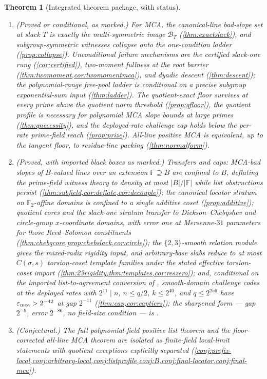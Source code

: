 \documentclass[11pt]{article}
\newtheorem{theorem}{Theorem}[section]
\theoremstyle{definition}
\newcommand{\F}{\mathbb F}
\newcommand{\eps}{\varepsilon}
\newcommand{\emca}{\eps_{\rm mca}}
\begin{document}
\begin{theorem}[Integrated theorem package, with status]
\begin{enumerate}[label=\textup{(\alph*)},leftmargin=2.4em]
\item \textup{(Proved or conditional, as marked.)}  For MCA, the canonical-line bad-slope set at slack $T$ is exactly the multi-symmetric image $\mathcal B_T$ (\cref{thm:exactslack}), and subgroup-symmetric witnesses collapse onto the one-condition ladder (\cref{prop:collapse}).  Unconditional failure mechanisms are the certified slack-one rung (\cref{cor:certified}), two-moment fullness at the root barrier (\cref{thm:twomoment,cor:twomomentmca}), and dyadic descent (\cref{thm:descent}); the polynomial-range free-pool ladder is conditional on a precise subgroup exponential-sum input (\cref{thm:ladder}).  The quotient-exact floor survives at every prime above the quotient norm threshold (\cref{prop:qfloor}), the quotient profile is necessary for polynomial MCA slope bounds at large primes (\cref{thm:qnecessity}), and the deployed-rate challenge cap holds below the per-rate prime-field reach (\cref{prop:prize}).  All-line positive MCA is equivalent, up to the tangent floor, to residue-line packing (\cref{thm:normalform}).
\item \textup{(Proved, with imported black boxes as marked.)}  Transfers and caps: MCA-bad slopes of $B$-valued lines over an extension $\F\supseteq B$ are confined to $B$, deflating the prime-field witness theory to density at most $|B|/|\F|$ while list obstructions persist (\cref{thm:subfield,cor:deflate,cor:decouple}); the canonical locator stratum on $\F_2$-affine domains is confined to a single additive coset (\cref{prop:additive}); quotient cores and the slack-one stratum transfer to Dickson--Chebyshev and circle-group $x$-coordinate domains, with error one at Mersenne-$31$ parameters for those Reed--Solomon constituents (\cref{thm:chebqcore,prop:chebslack,cor:circle}); the $\{2,3\}$-smooth relation module gives the mixed-radix rigidity input, and arbitrary-base slabs reduce to at most $C(\sigma,s)$ torsion-coset template families under the stated effective torsion-coset import (\cref{thm:23rigidity,thm:templates,cor:reszero}); and, conditional on the imported list-to-agreement conversion of \cite{CS25}, smooth-domain challenge codes at the deployed rates with $2^{11}\mid n$, $n\le q/2$, $k\le2^{40}$, and $q\le2^{256}$ have $\emca>2^{-42}$ at gap $2^{-11}$ (\cref{thm:cap,cor:captiers}); the sharpened form --- gap $2^{-9}$, error $2^{-86}$, no field-size condition --- is \cite{UniversalCap}.
\item \textup{(Conjectural.)}  The full polynomial-field positive list theorem and the floor-corrected all-line MCA theorem are isolated as finite-field local-limit statements with quotient exceptions explicitly separated (\cref{conj:prefix-local,conj:arbitrary-local,conj:listprofile,conj:B,conj:final-locator,conj:final-mca}).
\end{enumerate}
\end{theorem}
\end{document}
